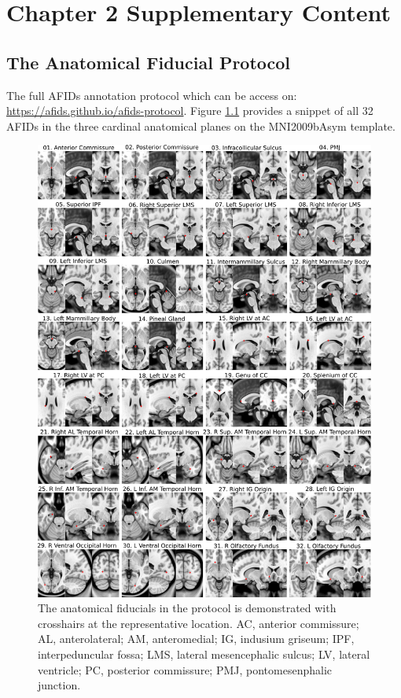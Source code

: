 \chapter{Chapter 2 Supplementary Content}\label{app:suppcontent}
\newpage

\section{The Anatomical Fiducial Protocol}\label{app:AFIDs_supp}
The full AFIDs annotation protocol which can be access on: \url{https://afids.github.io/afids-protocol}. Figure \ref{fig:figuresupall_afids} provides a snippet of all 32 AFIDs in the three cardinal anatomical planes on the MNI2009bAsym template. 

\begin{figure}
    \centering
    \includegraphics[width=0.95\linewidth]{figs/figuresupall_afids.png}
    \caption{The anatomical fiducials in the protocol is demonstrated with crosshairs at the representative location. AC, anterior commissure; AL, anterolateral; AM, anteromedial; IG, indusium griseum; IPF, interpeduncular fossa; LMS, lateral mesencephalic sulcus; LV, lateral ventricle; PC, posterior commissure; PMJ, pontomesenphalic junction.}
    \label{fig:figuresupall_afids}
\end{figure}


